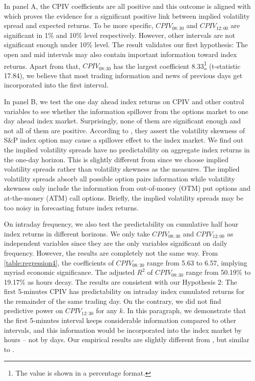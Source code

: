 In panel A, the CPIV coefficients are all positive and this outcome is aligned with \textcite{cremers2010deviations} which proves the evidence for a significant positive link between implied volatility spread and expected returns. To be more specific, $CPIV_{08:30}$ and $CPIV_{12:00}$ are significant in 1\% and 10\% level respectively. However, other intervals are not significant enough under 10\% level. The result validates our first hypothesis: The open and mid intervals may also contain important information toward index returns. Apart from that, $CPIV_{08:30}$ has the largest coefficient 8.33\footnote{The value is shown in a percentage format.} (t-statistic 17.84), we believe that most trading information and news of previous days get incorporated into the first interval.

In panel B, we test the one day ahead index returns on CPIV and other control variables to see whether the information spillover from the options market to one day ahead index market. Surprisingly, none of them are significant enough and not all of them are positive. According to \textcite{atilgan2015implied}, they assert the volatility skewness of S\&P index option may cause a spillover effect to the index market. We find out the implied volatility spreads have no predictability on aggregate index returns in the one-day horizon. This is slightly different from \textcite{atilgan2015implied} since we choose implied volatility spreads rather than volatility skewness as the measures. The implied volatility spreads absorb all possible option pairs information while volatility skewness only include the information from out-of-money (OTM) put options and at-the-money (ATM) call options. Briefly, the implied volatility spreads may be too noisy in forecasting future index returns.  

On intraday frequency, we also test the predictability on cumulative half hour index returns in different horizons. We only take $CPIV_{08:30}$ and $CPIV_{12:00}$ as independent variables since they are the only variables significant on daily frequency. However, the results are completely not the same way. From \autoref{table:regression4}, the coefficients of $CPIV_{08:30}$ range from 5.63 to 6.57, implying myriad economic significance. The adjusted $R^{2}$ of $CPIV_{08:30}$ range from 50.19\% to 19.17\% as hours decay. The results are consistent with our Hypothesis 2: The first 5-minutes CPIV has predictability on intraday index cumulated returns for the remainder of the same trading day. On the contrary, we did not find predictive power on $CPIV_{12:30}$ for any $k$. In this paragraph, we demonstrate that the first 5-minutes interval keeps considerable information compared to other intervals, and this information would be incorporated into the index market by hours -- not by days. Our empirical results are slightly different from \textcite{cremers2010deviations}, but similar to \textcite{kumar1992behavior}. 
   




